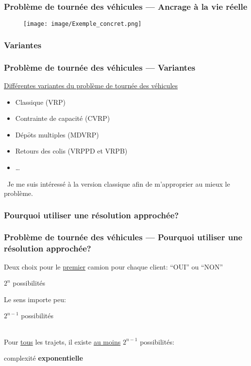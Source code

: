 \documentclass[10pt]{beamer}
\begin{document}
	\begin{frame}
		\frametitle{Problème de tournée des véhicules — Ancrage à la vie réelle}
		\begin{figure}
			\texttt{[image: image/Exemple\_concret.png]}
		\end{figure}		
	\end{frame}
	
	\subsubsection{Variantes}
	
	\begin{frame}
		\frametitle{Problème de tournée des véhicules — Variantes}
		\underline{Différentes variantes du problème de tournée des véhicules}
		\begin{itemize}[label=—]
			\item Classique (VRP)\pause%
			\item Contrainte de capacité (CVRP)\pause%
			\item Dép\(\hat{o} \)ts multiples (MDVRP)\pause%
			\item Retours des colis (VRPPD et VRPB)\pause%
			\item \dots 
		\end{itemize}
		\ \newline Je me suis intéressé à la version classique afin de m'approprier au mieux le problème.
	\end{frame}
	
	\subsubsection{Pourquoi utiliser une résolution approchée?}

	\begin{frame}
		\frametitle{Problème de tournée des véhicules — Pourquoi utiliser une résolution approchée?}
		Deux choix pour le \underline{premier} camion pour chaque client: ``OUI'' ou ``NON''
		\pause%
		\begin{center}
			\(2^n\) possibilités
		\end{center}
		\pause%
		Le sens importe peu:
		\begin{center}
			\(2^{n-1}\) possibilités
		\end{center}
		\pause%
		\  \\ Pour \underline{tous} les trajets, il existe \underline{au moins} \(2^{n-1}\) possibilités: \pause%
		\begin{center}
			complexité \textbf{exponentielle}
		\end{center}
	\end{frame}
\end{document}

